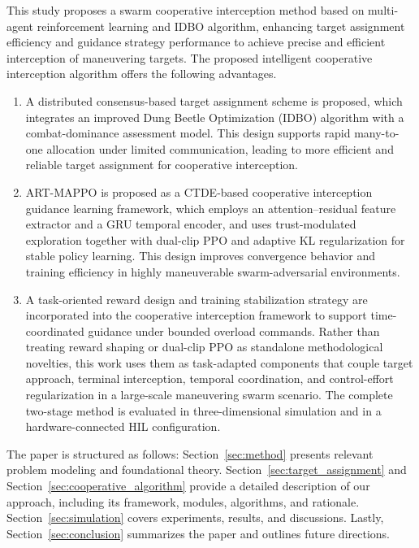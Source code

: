 \documentclass[lettersize,journal]{IEEEtran}
\providecommand{\DIFadd}[1]{{\protect\color{blue} #1}} %
\providecommand{\DIFaddbegin}{} %
\providecommand{\DIFaddend}{} %
\begin{document}
This study proposes a swarm cooperative interception method based on multi-agent reinforcement
learning and IDBO algorithm, enhancing target assignment efficiency and guidance strategy
performance to achieve precise and efficient interception of maneuvering targets.
The proposed intelligent cooperative interception algorithm offers the following advantages.

\begin{enumerate}
\item A distributed consensus-based target assignment scheme is proposed, which integrates an
improved Dung Beetle Optimization (IDBO) algorithm with a combat-dominance assessment model.
This design supports rapid many-to-one allocation under limited communication, leading to more
efficient and reliable target assignment for cooperative interception.

\item ART-MAPPO is proposed as a CTDE-based cooperative interception guidance learning
framework, which employs an attention--residual feature extractor and a GRU temporal encoder,
and uses trust-modulated exploration together with dual-clip PPO and adaptive KL
regularization for stable policy learning. This design improves convergence behavior and
training efficiency in highly maneuverable swarm-adversarial environments.

\item A task-oriented reward design and training stabilization strategy are incorporated into
the cooperative interception framework to support time-coordinated guidance under bounded
overload commands. Rather than treating reward shaping or dual-clip PPO as standalone
methodological novelties, this work uses them as task-adapted components that couple target
approach, terminal interception, temporal coordination, and control-effort regularization in a
large-scale maneuvering swarm scenario. \DIFaddbegin \DIFadd{The complete two-stage method is
evaluated in three-dimensional simulation and in a hardware-connected HIL
configuration.
}\DIFaddend \end{enumerate}

The paper is structured as follows: Section~\ref{sec:method} presents relevant problem modeling and foundational theory. Section~\ref{sec:target_assignment} and Section~\ref{sec:cooperative_algorithm} provide a detailed description of our approach, including its framework, modules, algorithms, and rationale. Section~\ref{sec:simulation} covers experiments, results, and discussions. Lastly, Section~\ref{sec:conclusion} summarizes the paper and outlines future directions.
\end{document}

